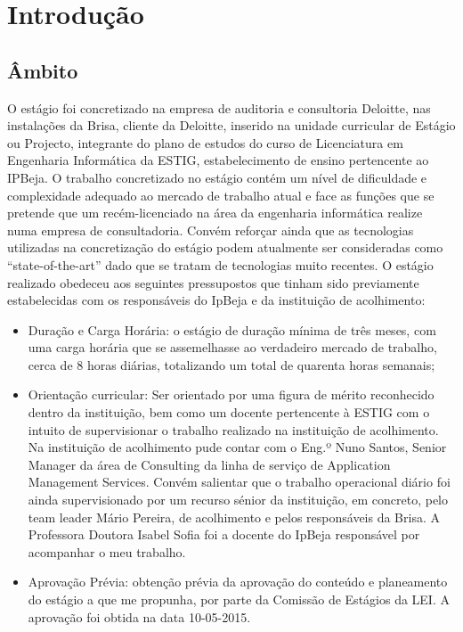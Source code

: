 \chapter{Introdução}
\label{intro}

\section{Âmbito}

\par O estágio foi concretizado na empresa de auditoria e consultoria Deloitte, nas instalações da Brisa, cliente da Deloitte, inserido na unidade curricular de Estágio ou Projecto, integrante do plano de estudos do curso de Licenciatura em Engenharia Informática da ESTIG, estabelecimento de ensino pertencente ao IPBeja. O trabalho concretizado no estágio contém um nível de dificuldade e complexidade adequado ao mercado de trabalho atual e face as funções que se pretende que um recém-licenciado na área da engenharia informática realize numa empresa de consultadoria. Convém reforçar ainda que as tecnologias utilizadas na concretização do estágio podem atualmente ser consideradas como “state-of-the-art” dado que se tratam de tecnologias muito recentes. O estágio realizado obedeceu aos seguintes pressupostos que tinham sido previamente estabelecidas com os responsáveis do IpBeja e da instituição de acolhimento:
\vspace{-0mm}
\begin{itemize}  \itemsep1pt \parskip0pt 
 \item Duração e Carga Horária: o estágio de duração mínima de três meses, com uma carga horária que se assemelhasse ao verdadeiro mercado de trabalho, cerca de 8 horas diárias, totalizando um total de quarenta horas semanais;
 \item Orientação curricular: Ser orientado por uma figura de mérito reconhecido dentro da instituição, bem como um docente pertencente à ESTIG com o intuito de supervisionar o trabalho realizado na instituição de acolhimento. Na instituição de acolhimento pude contar com o Eng.º Nuno Santos, Senior Manager da área de Consulting da linha de serviço de Application Management Services. Convém salientar que o trabalho operacional diário foi ainda supervisionado por um recurso sénior da instituição, em concreto, pelo team leader Mário Pereira, de acolhimento e pelos responsáveis da Brisa.  A Professora Doutora Isabel Sofia foi a docente do IpBeja responsável por acompanhar o meu trabalho.
\item Aprovação Prévia: obtenção prévia da aprovação do conteúdo e planeamento do estágio a que me propunha, por parte da Comissão de Estágios da LEI. A aprovação foi obtida na data 10-05-2015.
\end{itemize}


